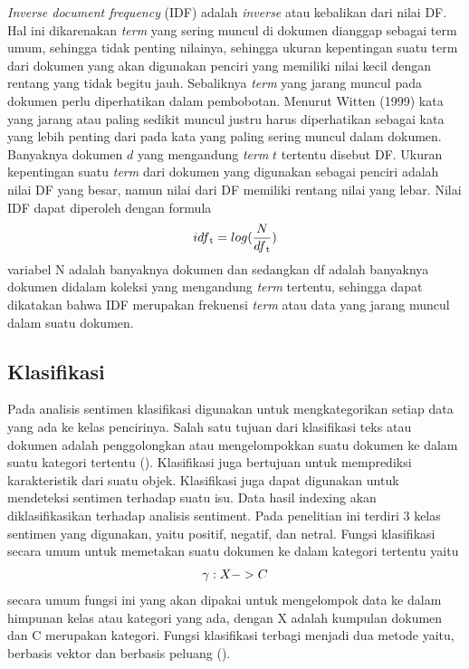 \textit{Inverse document frequency} (IDF) adalah \textit{inverse} atau kebalikan dari nilai DF. Hal ini dikarenakan \textit{term} yang sering muncul di dokumen dianggap sebagai term umum, sehingga tidak penting nilainya, sehingga ukuran kepentingan suatu term dari dokumen yang akan digunakan penciri yang memiliki nilai kecil dengan rentang yang tidak begitu jauh. Sebaliknya \textit{term} yang jarang muncul pada dokumen perlu diperhatikan dalam pembobotan. Menurut Witten (1999) kata yang jarang atau paling sedikit muncul justru harus diperhatikan sebagai kata yang lebih penting dari pada kata yang paling sering muncul dalam dokumen. Banyaknya dokumen $d$ yang mengandung \textit{term} $t$ tertentu disebut DF. Ukuran kepentingan suatu \textit{term} dari dokumen yang digunakan sebagai penciri adalah nilai DF yang besar, namun nilai dari DF memiliki rentang nilai yang lebar. Nilai IDF dapat diperoleh  dengan formula
\begin{equation}
idf\textsubscript{t} = log(\frac{N}{df\textsubscript{t}})
\end{equation}
variabel N adalah banyaknya dokumen dan sedangkan df adalah banyaknya dokumen didalam koleksi yang mengandung \textit{term} tertentu, sehingga dapat dikatakan bahwa IDF merupakan frekuensi \textit{term} atau data yang jarang muncul dalam suatu dokumen.



\subsection*{Klasifikasi}
Pada analisis sentimen klasifikasi digunakan untuk mengkategorikan setiap data yang ada ke kelas pencirinya. Salah satu tujuan dari klasifikasi teks atau dokumen adalah penggolongkan atau mengelompokkan suatu dokumen ke dalam suatu kategori tertentu
(\cite{MANNING2008}). Klasifikasi juga bertujuan untuk memprediksi karakteristik dari suatu objek. Klasifikasi juga dapat digunakan untuk mendeteksi sentimen terhadap suatu isu. Data hasil indexing akan diklasifikasikan terhadap analisis sentiment. Pada penelitian ini terdiri 3 kelas sentimen yang digunakan, yaitu positif, negatif, dan netral. Fungsi klasifikasi secara umum untuk memetakan suatu dokumen ke dalam kategori tertentu yaitu
\begin{equation}
\begin{split}
\tiny
\gamma : X -> C
\label{eq:klasifikasi}
\normalsize
\end{split}
\end{equation}
secara umum fungsi ini yang akan dipakai untuk mengelompok data ke dalam himpunan kelas atau kategori yang ada, dengan X adalah kumpulan dokumen dan C merupakan kategori. Fungsi klasifikasi terbagi menjadi dua metode yaitu, berbasis vektor dan berbasis peluang (\cite{MANNING2008}). 

